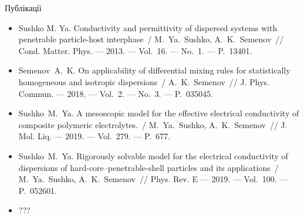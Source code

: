 \documentclass[10pt]{beamer}
\begin{document}
\begin{frame}{Публікації}
\footnotesize
  \begin{itemize}
    \item
    Sushko M. Ya. Conductivity and permittivity of dispersed systems 
    with penetrable particle-host interphase~/ M.~Ya.~Sushko, 
    A.~K.~Semenov~// Cond. Matter. Phys. --- 2013. --- Vol.~16. --- No.~1. 
    --- P.~13401.
    
    \item
    Semenov~A.~K. On applicability of differential mixing rules for
      statistically homogeneous and isotropic dispersions~/ A.~K.~Semenov~//
      J. Phys. Commun. --- 2018. --- Vol.~2. --- No.~3. --- P.~035045.
    
    \item
    Sushko~M.~Ya. A mesoscopic model for the effective electrical 
    conductivity of composite polymeric electrolytes.~/ M.~Ya.~Sushko,
    A.~K.~Semenov~// J. Mol. Liq. --- 2019. --- Vol.~279. --- P.~677. 
    
    \item
    Sushko~M.~Ya. Rigorously solvable model for the electrical conductivity of dispersions of hard-core--penetrable-shell particles and its applications~/
    M.~Ya.~Su\-shko, A.~K.~Semenov~//
    Phys. Rev. E --- 2019. --- Vol.~100. --- P.~052601.
    
    \item
    ???
  \end{itemize}

\end{frame}
\end{document}
